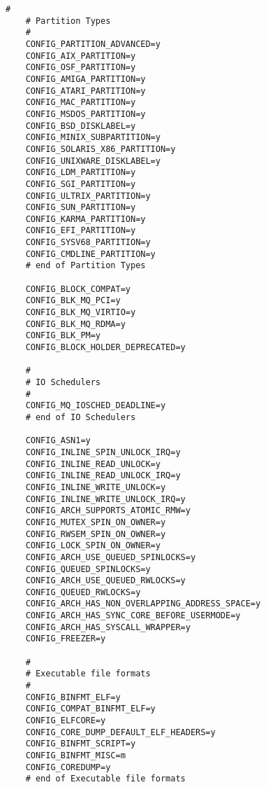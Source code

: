 \begin{multicols}{2}
\begin{lstlisting}[caption=kernel config,label=kconfig,]
    #
    # Partition Types
    #
    CONFIG_PARTITION_ADVANCED=y
    CONFIG_AIX_PARTITION=y
    CONFIG_OSF_PARTITION=y
    CONFIG_AMIGA_PARTITION=y
    CONFIG_ATARI_PARTITION=y
    CONFIG_MAC_PARTITION=y
    CONFIG_MSDOS_PARTITION=y
    CONFIG_BSD_DISKLABEL=y
    CONFIG_MINIX_SUBPARTITION=y
    CONFIG_SOLARIS_X86_PARTITION=y
    CONFIG_UNIXWARE_DISKLABEL=y
    CONFIG_LDM_PARTITION=y
    CONFIG_SGI_PARTITION=y
    CONFIG_ULTRIX_PARTITION=y
    CONFIG_SUN_PARTITION=y
    CONFIG_KARMA_PARTITION=y
    CONFIG_EFI_PARTITION=y
    CONFIG_SYSV68_PARTITION=y
    CONFIG_CMDLINE_PARTITION=y
    # end of Partition Types
    
    CONFIG_BLOCK_COMPAT=y
    CONFIG_BLK_MQ_PCI=y
    CONFIG_BLK_MQ_VIRTIO=y
    CONFIG_BLK_MQ_RDMA=y
    CONFIG_BLK_PM=y
    CONFIG_BLOCK_HOLDER_DEPRECATED=y
    
    #
    # IO Schedulers
    #
    CONFIG_MQ_IOSCHED_DEADLINE=y
    # end of IO Schedulers
    
    CONFIG_ASN1=y
    CONFIG_INLINE_SPIN_UNLOCK_IRQ=y
    CONFIG_INLINE_READ_UNLOCK=y
    CONFIG_INLINE_READ_UNLOCK_IRQ=y
    CONFIG_INLINE_WRITE_UNLOCK=y
    CONFIG_INLINE_WRITE_UNLOCK_IRQ=y
    CONFIG_ARCH_SUPPORTS_ATOMIC_RMW=y
    CONFIG_MUTEX_SPIN_ON_OWNER=y
    CONFIG_RWSEM_SPIN_ON_OWNER=y
    CONFIG_LOCK_SPIN_ON_OWNER=y
    CONFIG_ARCH_USE_QUEUED_SPINLOCKS=y
    CONFIG_QUEUED_SPINLOCKS=y
    CONFIG_ARCH_USE_QUEUED_RWLOCKS=y
    CONFIG_QUEUED_RWLOCKS=y
    CONFIG_ARCH_HAS_NON_OVERLAPPING_ADDRESS_SPACE=y
    CONFIG_ARCH_HAS_SYNC_CORE_BEFORE_USERMODE=y
    CONFIG_ARCH_HAS_SYSCALL_WRAPPER=y
    CONFIG_FREEZER=y
    
    #
    # Executable file formats
    #
    CONFIG_BINFMT_ELF=y
    CONFIG_COMPAT_BINFMT_ELF=y
    CONFIG_ELFCORE=y
    CONFIG_CORE_DUMP_DEFAULT_ELF_HEADERS=y
    CONFIG_BINFMT_SCRIPT=y
    CONFIG_BINFMT_MISC=m
    CONFIG_COREDUMP=y
    # end of Executable file formats
    

\end{lstlisting}
\end{multicols}
